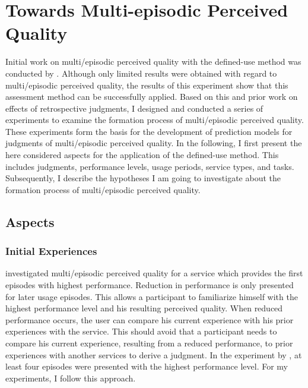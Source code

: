 \chapter{Towards Multi-episodic Perceived Quality}\label{chap:towards}
Initial work on multi\-/episodic perceived quality with the  defined-use method was conducted by \citet{moller_single-call_2011}.
Although only limited results were obtained with regard to multi\-/episodic perceived quality, the results of this experiment show that this assessment method can be successfully applied.
Based on this and prior work on effects of retrospective judgments, I designed and conducted a series of experiments to examine the formation process of multi\-/episodic perceived quality. 
These experiments form the basis for the development of prediction models for judgments of multi\-/episodic perceived quality.
In the following, I first present the here considered aspects for the application of the defined-use method.
This includes judgments, performance levels, usage periods, service types, and tasks.
Subsequently, I describe the hypotheses I am going to investigate about the formation process of multi\-/episodic perceived quality.

\section{Aspects}

\subsection{Initial Experiences}
\citet{moller_single-call_2011} investigated multi\-/episodic perceived quality for a service which provides the first episodes with highest performance.
Reduction in performance is only presented for later usage episodes.
This allows a participant to familiarize himself with the highest performance level and his resulting perceived quality.
When reduced performance occurs, the user can compare his current experience with his prior experiences with the service.
This should avoid that a participant needs to compare his current experience, resulting from a reduced performance, to prior experiences with another services to derive a judgment.
In the experiment by \citet{moller_single-call_2011}, at least four episodes were presented with the highest performance level.
For my experiments, I follow this approach.

